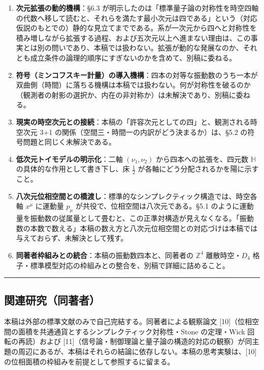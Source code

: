 \documentclass[
]{ltjsarticle}
\providecommand{\tightlist}{%
  \setlength{\itemsep}{0pt}\setlength{\parskip}{0pt}}
\begin{document}
\begin{enumerate}
\def\labelenumi{\arabic{enumi}.}
\tightlist
\item
  \textbf{次元拡張の動的機構}：§6.3
  が明示したのは「標準量子論の対称性を時空四軸の代数へ移して読むと、それらを満たす最小次元は四である」という（対応仮説のもとでの）静的な見立てまでである。系が一次元から四へと対称性を積み増しながら拡張する過程、および五次元以上へ進まない理由は、この事実とは別の問いであり、本稿では扱わない。拡張が動的な発展なのか、それとも成立条件の論理的順序にすぎないのかを含めて、別稿に委ねる。
\item
  \textbf{符号（ミンコフスキー計量）の導入機構}：四本の対等な振動数のうち一本が双曲側（時間）に落ちる機構は本稿では扱わない。何が対称性を破るのか（観測者の射影の選択か、内在の非対称か）は未解決であり、別稿に委ねる。
\item
  \textbf{現実の時空次元との接続}：本稿の「許容次元としての四」と、観測される時空次元
  3+1 の関係（空間三・時間一の内訳がどう決まるか）は、§5.2
  の符号問題と同じく未解決である。
\item
  \textbf{低次元トイモデルの明示化}：二軸 \((\nu_1,\nu_2)\)
  から四本への拡張を、四元数 \(\mathbb{H}\)
  の具体的な作用として書き下し、床 \(\tfrac12\)
  が各軸にどう分配されるかを陽に示すこと。
\item
  \textbf{八次元位相空間との橋渡し}：標準的なシンプレクティック構造では、時空各軸
  \(x^\mu\) に運動量 \(p_\mu\) が共役で、位相空間は八次元である。§5.1
  のように運動量を振動数の従属量として畳むと、この正準対構造が見えなくなる。「振動数の本数で数える」本稿の数え方と八次元位相空間との対応づけは本稿では与えておらず、未解決として残す。
\item
  \textbf{同著者枠組みとの統合}：本稿の振動数四本と、同著者の
  \(\mathbb{Z}^4\) 離散時空・\(D_4\)
  格子・標準模型対応の枠組みとの整合を、別稿で詳細に詰めること。
\end{enumerate}

\begin{center}\rule{0.5\linewidth}{0.5pt}\end{center}

\subsection{関連研究（同著者）}\label{ux95a2ux9023ux7814ux7a76ux540cux8457ux8005}

本稿は外部の標準文献のみで自己完結する。同著者による観察論文
{[}10{]}（位相空間の面積を共通通貨とするシンプレクティック対称性・Stone
の定理・Wick 回転の再読）および
{[}11{]}（信号論・制御理論と量子論の構造的対応の観察）が同主題の周辺にあるが、本稿はそれらの結論に依存しない。本稿の思考実験は、{[}10{]}
の位相面積の枠組みを前提として参照するに留まる。
\end{document}
